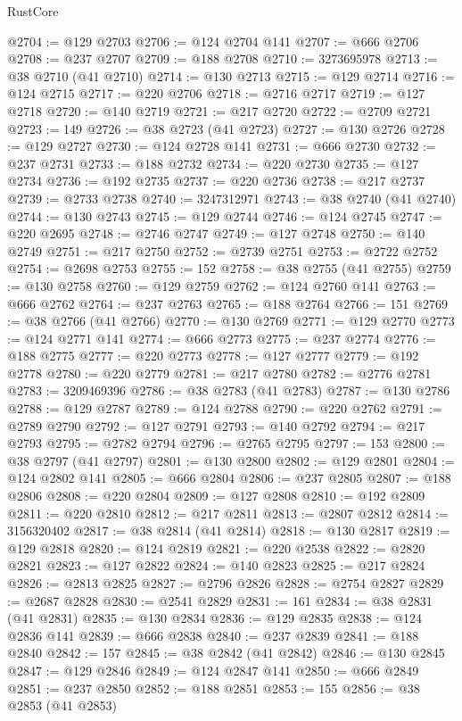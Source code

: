 \begin{lexlean}{RustCore}
\begin{coremodule}
@2704 := @129 @2703
@2706 := @124 @2704 @141
@2707 := @666 @2706
@2708 := @237 @2707
@2709 := @188 @2708
@2710 := 3273695978
@2713 := @38 @2710 (@41 @2710)
@2714 := @130 @2713
@2715 := @129 @2714
@2716 := @124 @2715
@2717 := @220 @2706
@2718 := @2716 @2717
@2719 := @127 @2718
@2720 := @140 @2719
@2721 := @217 @2720
@2722 := @2709 @2721
@2723 := 149
@2726 := @38 @2723 (@41 @2723)
@2727 := @130 @2726
@2728 := @129 @2727
@2730 := @124 @2728 @141
@2731 := @666 @2730
@2732 := @237 @2731
@2733 := @188 @2732
@2734 := @220 @2730
@2735 := @127 @2734
@2736 := @192 @2735
@2737 := @220 @2736
@2738 := @217 @2737
@2739 := @2733 @2738
@2740 := 3247312971
@2743 := @38 @2740 (@41 @2740)
@2744 := @130 @2743
@2745 := @129 @2744
@2746 := @124 @2745
@2747 := @220 @2695
@2748 := @2746 @2747
@2749 := @127 @2748
@2750 := @140 @2749
@2751 := @217 @2750
@2752 := @2739 @2751
@2753 := @2722 @2752
@2754 := @2698 @2753
@2755 := 152
@2758 := @38 @2755 (@41 @2755)
@2759 := @130 @2758
@2760 := @129 @2759
@2762 := @124 @2760 @141
@2763 := @666 @2762
@2764 := @237 @2763
@2765 := @188 @2764
@2766 := 151
@2769 := @38 @2766 (@41 @2766)
@2770 := @130 @2769
@2771 := @129 @2770
@2773 := @124 @2771 @141
@2774 := @666 @2773
@2775 := @237 @2774
@2776 := @188 @2775
@2777 := @220 @2773
@2778 := @127 @2777
@2779 := @192 @2778
@2780 := @220 @2779
@2781 := @217 @2780
@2782 := @2776 @2781
@2783 := 3209469396
@2786 := @38 @2783 (@41 @2783)
@2787 := @130 @2786
@2788 := @129 @2787
@2789 := @124 @2788
@2790 := @220 @2762
@2791 := @2789 @2790
@2792 := @127 @2791
@2793 := @140 @2792
@2794 := @217 @2793
@2795 := @2782 @2794
@2796 := @2765 @2795
@2797 := 153
@2800 := @38 @2797 (@41 @2797)
@2801 := @130 @2800
@2802 := @129 @2801
@2804 := @124 @2802 @141
@2805 := @666 @2804
@2806 := @237 @2805
@2807 := @188 @2806
@2808 := @220 @2804
@2809 := @127 @2808
@2810 := @192 @2809
@2811 := @220 @2810
@2812 := @217 @2811
@2813 := @2807 @2812
@2814 := 3156320402
@2817 := @38 @2814 (@41 @2814)
@2818 := @130 @2817
@2819 := @129 @2818
@2820 := @124 @2819
@2821 := @220 @2538
@2822 := @2820 @2821
@2823 := @127 @2822
@2824 := @140 @2823
@2825 := @217 @2824
@2826 := @2813 @2825
@2827 := @2796 @2826
@2828 := @2754 @2827
@2829 := @2687 @2828
@2830 := @2541 @2829
@2831 := 161
@2834 := @38 @2831 (@41 @2831)
@2835 := @130 @2834
@2836 := @129 @2835
@2838 := @124 @2836 @141
@2839 := @666 @2838
@2840 := @237 @2839
@2841 := @188 @2840
@2842 := 157
@2845 := @38 @2842 (@41 @2842)
@2846 := @130 @2845
@2847 := @129 @2846
@2849 := @124 @2847 @141
@2850 := @666 @2849
@2851 := @237 @2850
@2852 := @188 @2851
@2853 := 155
@2856 := @38 @2853 (@41 @2853)

\end{coremodule}
\end{lexlean}
